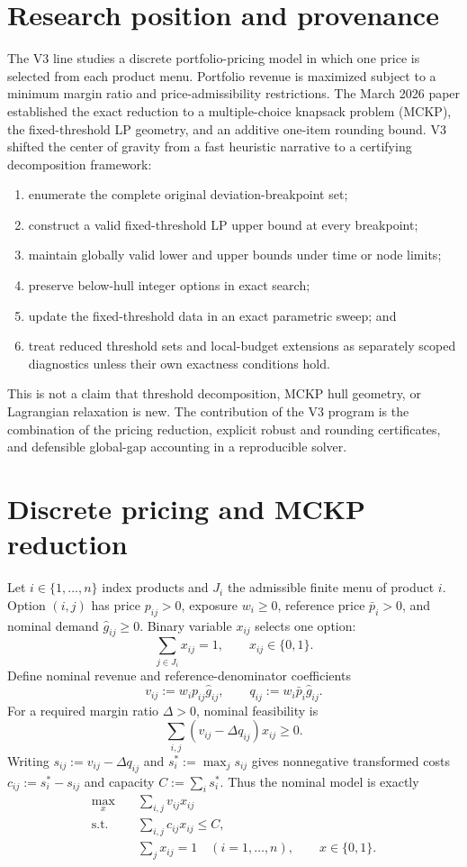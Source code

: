 \documentclass[11pt,a4paper]{article}
\theoremstyle{definition}
\theoremstyle{remark}
\begin{document}
\section{Research position and provenance}

The V3 line studies a discrete portfolio-pricing model in which one price is
selected from each product menu. Portfolio revenue is maximized subject to a
minimum margin ratio and price-admissibility restrictions. The March 2026
paper established the exact reduction to a multiple-choice knapsack problem
(MCKP), the fixed-threshold LP geometry, and an additive one-item rounding
bound. V3 shifted the center of gravity from a fast heuristic narrative to a
certifying decomposition framework:

\begin{enumerate}
\item enumerate the complete original deviation-breakpoint set;
\item construct a valid fixed-threshold LP upper bound at every breakpoint;
\item maintain globally valid lower and upper bounds under time or node limits;
\item preserve below-hull integer options in exact search;
\item update the fixed-threshold data in an exact parametric sweep; and
\item treat reduced threshold sets and local-budget extensions as separately
scoped diagnostics unless their own exactness conditions hold.
\end{enumerate}

This is not a claim that threshold decomposition, MCKP hull geometry, or
Lagrangian relaxation is new. The contribution of the V3 program is the
combination of the pricing reduction, explicit robust and rounding
certificates, and defensible global-gap accounting in a reproducible solver.

\section{Discrete pricing and MCKP reduction}

Let $i\in\{1,\ldots,n\}$ index products and $J_i$ the admissible finite menu of
product $i$. Option $(i,j)$ has price $p_{ij}>0$, exposure $w_i\ge0$, reference
price $\bar p_i>0$, and nominal demand $\hat g_{ij}\ge0$. Binary variable
$x_{ij}$ selects one option:
\[
  \sum_{j\in J_i}x_{ij}=1,\qquad x_{ij}\in\{0,1\}.
\]
Define nominal revenue and reference-denominator coefficients
\[
  v_{ij}:=w_i p_{ij}\hat g_{ij},\qquad
  q_{ij}:=w_i\bar p_i\hat g_{ij}.
\]
For a required margin ratio $\Delta>0$, nominal feasibility is
\[
  \sum_{i,j}(v_{ij}-\Delta q_{ij})x_{ij}\ge0.
\]
Writing $s_{ij}:=v_{ij}-\Delta q_{ij}$ and
$s_i^*:=\max_j s_{ij}$ gives nonnegative transformed costs
$c_{ij}:=s_i^*-s_{ij}$ and capacity $C:=\sum_i s_i^*$. Thus the nominal model
is exactly
\begin{align*}
  \max_x\quad &\sum_{i,j}v_{ij}x_{ij}\\
  \text{s.t.}\quad &\sum_{i,j}c_{ij}x_{ij}\le C,\\
  &\sum_jx_{ij}=1\quad(i=1,\ldots,n),\qquad x\in\{0,1\}.
\end{align*}
\end{document}

